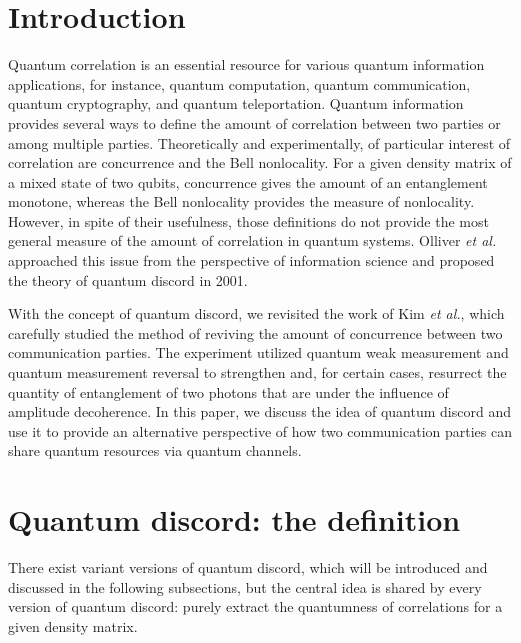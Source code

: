 \documentclass[%
 reprint,
 amsmath,amssymb,
 aps,
]{revtex4-1}
\begin{document}
\maketitle


\section{Introduction}
\noindent Quantum correlation is an essential resource for various quantum information applications, for instance, quantum computation, quantum communication, quantum cryptography, and quantum teleportation. Quantum information provides several ways to define the amount of correlation between two parties or among multiple parties. Theoretically and experimentally, of particular interest of correlation are concurrence and the Bell nonlocality. For a given density matrix of a mixed state of two qubits, concurrence gives the amount of an entanglement monotone, whereas the Bell nonlocality provides the measure of nonlocality. However, in spite of their usefulness, those definitions do not provide the most general measure of the amount of correlation in quantum systems. Olliver \textit{et al.} approached this issue from the perspective of information science and proposed the theory of quantum discord in 2001.

With the concept of quantum discord, we revisited the work of Kim \textit{et al.}, which carefully studied the method of reviving the amount of concurrence between two communication parties. The experiment utilized quantum weak measurement and quantum measurement reversal to strengthen and, for certain cases, resurrect the quantity of entanglement of two photons that are under the influence of amplitude decoherence. In this paper, we discuss the idea of quantum discord and use it to provide an alternative perspective of how two communication parties can share quantum resources via quantum channels. 

\section{Quantum discord: the definition}
\noindent There exist variant versions of quantum discord, which will be introduced and discussed in the following subsections, but the central idea is shared by every version of quantum discord: purely extract the quantumness of correlations for a given density matrix. 
\end{document}

